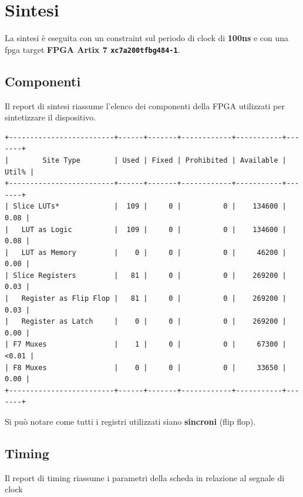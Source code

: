 \documentclass[a4paper]{report}
\begin{document}
\section{Sintesi}
La sintesi è eseguita con un constraint sul periodo di clock di \textbf{100ns} e con una fpga target \textbf{FPGA Artix 7 \texttt{xc7a200tfbg484-1}}.
\subsection{Componenti}
Il report di sintesi riassume l'elenco dei componenti della FPGA utilizzati per sintetizzare il dispositivo.

\begin{verbatim}
+-------------------------+------+-------+------------+-----------+-------+
|        Site Type        | Used | Fixed | Prohibited | Available | Util% |
+-------------------------+------+-------+------------+-----------+-------+
| Slice LUTs*             |  109 |     0 |          0 |    134600 |  0.08 |
|   LUT as Logic          |  109 |     0 |          0 |    134600 |  0.08 |
|   LUT as Memory         |    0 |     0 |          0 |     46200 |  0.00 |
| Slice Registers         |   81 |     0 |          0 |    269200 |  0.03 |
|   Register as Flip Flop |   81 |     0 |          0 |    269200 |  0.03 |
|   Register as Latch     |    0 |     0 |          0 |    269200 |  0.00 |
| F7 Muxes                |    1 |     0 |          0 |     67300 | <0.01 |
| F8 Muxes                |    0 |     0 |          0 |     33650 |  0.00 |
+-------------------------+------+-------+------------+-----------+-------+
\end{verbatim}

Si può notare come tutti i registri utilizzati siano    \textbf{sincroni} (flip flop).

\subsection{Timing}
Il report di timing riassume i parametri della scheda in relazione al segnale di clock
\end{document}
